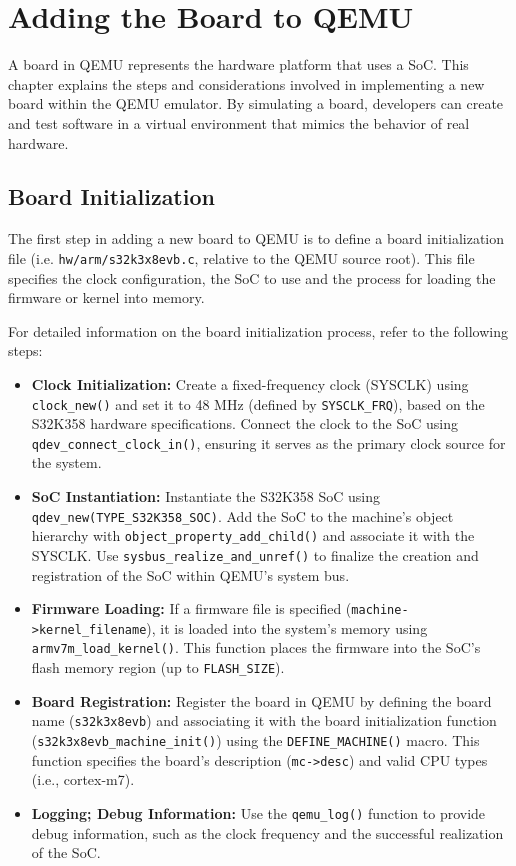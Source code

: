 

\chapter{Adding the Board to QEMU}
A board in QEMU represents the hardware platform that uses a SoC. This chapter explains the steps and considerations involved in implementing a new board within the QEMU emulator. By simulating a board, developers can create and test software in a virtual environment that mimics the behavior of real hardware.
\section{Board Initialization}
The first step in adding a new board to QEMU is to define a board initialization file (i.e. \texttt{hw/arm/s32k3x8evb.c}, relative to the QEMU source root). This file specifies the clock configuration, the SoC to use and the process for loading the firmware or kernel into memory.

\vspace{0.3cm}

\noindent For detailed information on the board initialization process, refer to the following steps:
\begin{itemize}
    \item \textbf{Clock Initialization:} Create a fixed-frequency clock (SYSCLK) using \texttt{clock\_new()} and set it to 48 MHz (defined by \texttt{SYSCLK\_FRQ}), based on the S32K358 hardware specifications. Connect the clock to the SoC using \texttt{qdev\_connect\_clock\_in()}, ensuring it serves as the primary clock source for the system.
    \item \textbf{SoC Instantiation:} Instantiate the S32K358 SoC using \texttt{qdev\_new(TYPE\_S32K358\_SOC)}. Add the SoC to the machine’s object hierarchy with \texttt{object\_property\_add\_child()} and associate it with the SYSCLK. Use \texttt{sysbus\_realize\_and\_unref()} to finalize the creation and registration of the SoC within QEMU’s system bus.
    \item \textbf{Firmware Loading:} If a firmware file is specified (\texttt{machine->kernel\_filename}), it is loaded into the system's memory using \texttt{armv7m\_load\_kernel()}. This function places the firmware into the SoC’s flash memory region (up to \texttt{FLASH\_SIZE}).
    \item \textbf{Board Registration:} Register the board in QEMU by defining the board name (\texttt{s32k3x8evb}) and associating it with the board initialization function (\texttt{s32k3x8evb\_machine\_init()}) using the \texttt{DEFINE\_MACHINE()} macro. This function specifies the board's description (\texttt{mc->desc}) and valid CPU types (i.e., cortex-m7).
    \item \textbf{Logging; Debug Information:} Use the \texttt{qemu\_log()} function to provide debug information, such as the clock frequency and the successful realization of the SoC.
\end{itemize}


